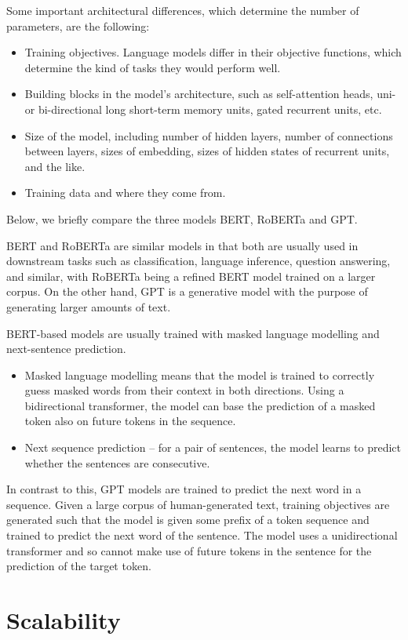 Some important architectural differences, which determine the number of parameters, are the following:
\begin{itemize}
    \item Training objectives. Language models differ in their objective functions, which determine the kind of tasks they would perform well.
    \item Building blocks in the model's architecture, such as self-attention heads, uni- or bi-directional long short-term memory units, gated recurrent units, etc.
    \item Size of the model, including number of hidden layers, number of connections between layers, sizes of embedding, sizes of hidden states of recurrent units, and the like.
    \item Training data and where they come from.
\end{itemize}
Below, we briefly compare the three models BERT, RoBERTa and GPT.

BERT and RoBERTa are similar models in that both are usually used in downstream tasks such as classification, language inference, question answering, and similar, with RoBERTa being a refined BERT model trained on a larger corpus. On the other hand, GPT is a generative model with the purpose of generating larger amounts of text.

BERT-based models are usually trained with masked language modelling and next-sentence prediction.
\begin{itemize}
    \item Masked language modelling means that the model is trained to correctly guess masked words from their context in both directions. Using a bidirectional transformer, the model can base the prediction of a masked token also on future tokens in the sequence.
    \item Next sequence prediction -- for a pair of sentences, the model learns to predict whether the sentences are consecutive.
\end{itemize}
In contrast to this, GPT models are trained to predict the next word in a sequence. Given a large corpus of human-generated text, training objectives are generated such that the model is given some prefix of a token sequence and trained to predict the next word of the sentence. The model uses a unidirectional transformer and so cannot make use of future tokens in the sentence for the prediction of the target token.

\section{Scalability}

